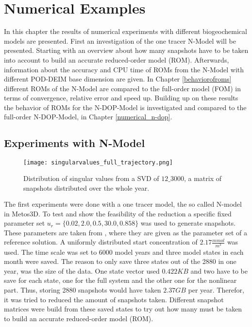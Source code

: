 

\chapter{Numerical Examples} %
\label{Chapter4} 
In this chapter the results of numerical experiments with different biogeochemical models are presented. First an investigation of the one tracer N-Model will be presented. 
Starting with an overview about how many snapshots have to be taken into account to build an accurate reduced-order model (ROM). Afterwards, information about the accuracy and CPU time of ROMs from the N-Model with different POD-DEIM base dimension
are given. In Chapter \ref{behaviorofroms} different ROMs of the N-Model are compared to the full-order model (FOM) in terms of convergence, relative error and speed up. 
Building up on these results the behavior of ROMs for the N-DOP-Model is investigated and compared to the full-order N-DOP-Model, in Chapter \ref{numerical_n-dop}.



\section{Experiments with N-Model}
\label{Chapter4_N} 
\begin{figure}[!ht]
\centering
  \texttt{[image: singularvalues\_full\_trajectory.png]}
  \caption{Distribution of singular values from a SVD of $12\_3000$, a matrix of snapshots distributed over the whole year.}
  \label{fig:singularvalues_full_trajectory}
\end{figure}

The first experiments were done with a one tracer model, the so called N-model
in Metos3D. To test and show the feasibility of the reduction a specific fixed parameter set $u_r =\{0.02,2.0,0.5,30.0,0.858\}$ was used to generate snapshots. These
parameters are taken from \cite{metos3dsimpack}, where they are given as the parameter set of a reference solution. A  uniformly distributed start concentration of $2.17\frac{mmol}{m^3}$ was used.
The time scale was set to $6000$ model years and three model states in each month were saved. The reason to only save three states out of the 2880 in one year, was the size of the data. One state vector used $0.422KB$ and two have to be save for each state, one for the full system and the other one for the nonlinear part. Thus, storing 2880 snapshots would have taken
$2.37GB$ per year.
Therefor, it was tried to reduced the amount of snapshots taken.
Different snapshot matrices were build from these saved states to try out how many must be taken to build an accurate reduced-order model (ROM). 

